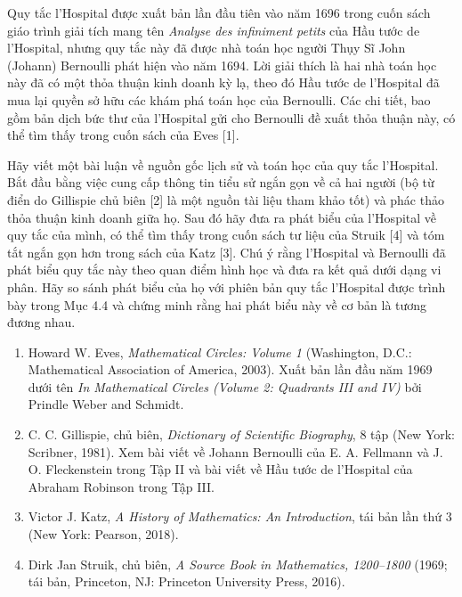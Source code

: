 \documentclass[11pt,twoside]{article}
\begin{document}
\begin{minipage}[t]{0.705\textwidth}
  \vspace{0pt}
  \begin{tcolorbox}[
    enhanced,
    colback=boxbg,
    colframe=boxbg,
    boxrule=0pt,
    arc=0pt,
    left=12pt,
    right=12pt,
    top=10pt,
    bottom=10pt
  ]
    \fontsize{9.5}{13.5}\selectfont
    Quy tắc l’Hospital được xuất bản lần đầu tiên vào năm 1696 trong cuốn sách giáo trình giải tích mang tên \textit{Analyse des infiniment petits} của Hầu tước de l’Hospital, nhưng quy tắc này đã được nhà toán học người Thụy Sĩ John (Johann) Bernoulli phát hiện vào năm 1694. Lời giải thích là hai nhà toán học này đã có một thỏa thuận kinh doanh kỳ lạ, theo đó Hầu tước de l’Hospital đã mua lại quyền sở hữu các khám phá toán học của Bernoulli. Các chi tiết, bao gồm bản dịch bức thư của l’Hospital gửi cho Bernoulli đề xuất thỏa thuận này, có thể tìm thấy trong cuốn sách của Eves [1].

    \vspace{0.28cm}
    Hãy viết một bài luận về nguồn gốc lịch sử và toán học của quy tắc l’Hospital. Bắt đầu bằng việc cung cấp thông tin tiểu sử ngắn gọn về cả hai người (bộ từ điển do Gillispie chủ biên [2] là một nguồn tài liệu tham khảo tốt) và phác thảo thỏa thuận kinh doanh giữa họ. Sau đó hãy đưa ra phát biểu của l’Hospital về quy tắc của mình, có thể tìm thấy trong cuốn sách tư liệu của Struik [4] và tóm tắt ngắn gọn hơn trong sách của Katz [3]. Chú ý rằng l’Hospital và Bernoulli đã phát biểu quy tắc này theo quan điểm hình học và đưa ra kết quả dưới dạng vi phân. Hãy so sánh phát biểu của họ với phiên bản quy tắc l’Hospital được trình bày trong Mục 4.4 và chứng minh rằng hai phát biểu này về cơ bản là tương đương nhau.

    \vspace{0.32cm}
    \begin{enumerate}[label=\textbf{\arabic*.}, leftmargin=1.4em, itemsep=4pt, topsep=0pt, parsep=0pt]
      \item Howard W. Eves, \textit{Mathematical Circles: Volume 1} (Washington, D.C.: Mathematical Association of America, 2003). Xuất bản lần đầu năm 1969 dưới tên \textit{In Mathematical Circles (Volume 2: Quadrants III and IV)} bởi Prindle Weber and Schmidt.
      \item C. C. Gillispie, chủ biên, \textit{Dictionary of Scientific Biography}, 8 tập (New York: Scribner, 1981). Xem bài viết về Johann Bernoulli của E. A. Fellmann và J. O. Fleckenstein trong Tập II và bài viết về Hầu tước de l’Hospital của Abraham Robinson trong Tập III.
      \item Victor J. Katz, \textit{A History of Mathematics: An Introduction}, tái bản lần thứ 3 (New York: Pearson, 2018).
      \item Dirk Jan Struik, chủ biên, \textit{A Source Book in Mathematics, 1200--1800} (1969; tái bản, Princeton, NJ: Princeton University Press, 2016).
    \end{enumerate}
  \end{tcolorbox}
\end{minipage}
\end{document}
